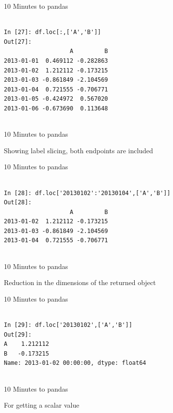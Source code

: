 \documentclass{beamer}
\begin{document}
\begin{frame}[t,fragile]{10 Minutes to pandas}


	\scriptsize
\begin{verbatim}

In [27]: df.loc[:,['A','B']]
Out[27]: 
                   A         B
2013-01-01  0.469112 -0.282863
2013-01-02  1.212112 -0.173215
2013-01-03 -0.861849 -2.104569
2013-01-04  0.721555 -0.706771
2013-01-05 -0.424972  0.567020
2013-01-06 -0.673690  0.113648


\end{verbatim}


\end{frame}


\begin{frame}[t]{10 Minutes to pandas}

Showing label slicing, both endpoints are included

\end{frame}


\begin{frame}[t,fragile]{10 Minutes to pandas}


	\scriptsize
\begin{verbatim}

In [28]: df.loc['20130102':'20130104',['A','B']]
Out[28]: 
                   A         B
2013-01-02  1.212112 -0.173215
2013-01-03 -0.861849 -2.104569
2013-01-04  0.721555 -0.706771


\end{verbatim}


\end{frame}


\begin{frame}[t]{10 Minutes to pandas}

Reduction in the dimensions of the returned object

\end{frame}


\begin{frame}[t,fragile]{10 Minutes to pandas}


	\scriptsize
\begin{verbatim}

In [29]: df.loc['20130102',['A','B']]
Out[29]: 
A    1.212112
B   -0.173215
Name: 2013-01-02 00:00:00, dtype: float64


\end{verbatim}


\end{frame}


\begin{frame}[t]{10 Minutes to pandas}

For getting a scalar value

\end{frame}
\end{document}

